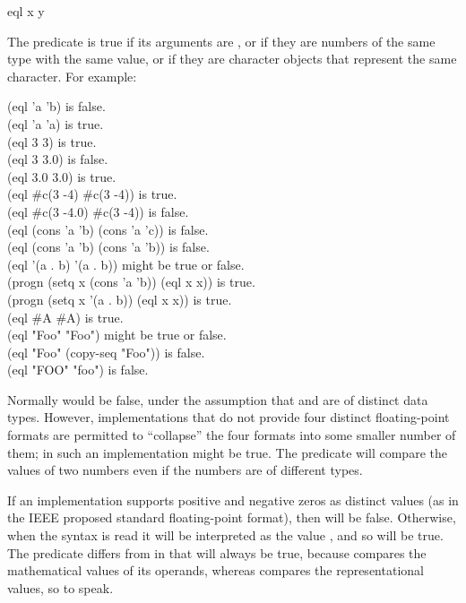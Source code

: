 \begin{defun}[Function]
eql x y

The  predicate is true if its arguments are ,
or if they are numbers of the same type with the same value,
or if they are character objects
that represent the same character.
For example:
\begin{lisp}
(eql 'a 'b) {\rm is false.} \\
(eql 'a 'a) {\rm is true.} \\
(eql 3 3) {\rm is true.} \\
(eql 3 3.0) {\rm is false.} \\
(eql 3.0 3.0) {\rm is true.} \\
(eql \#c(3 -4) \#c(3 -4)) {\rm is true.} \\
(eql \#c(3 -4.0) \#c(3 -4)) {\rm is false.} \\
(eql (cons 'a 'b) (cons 'a 'c)) {\rm is false.} \\
(eql (cons 'a 'b) (cons 'a 'b)) {\rm is false.} \\
(eql '(a . b) '(a . b)) {\rm might be true or false.} \\
(progn (setq x (cons 'a 'b)) (eql x x)) {\rm is true.} \\
(progn (setq x '(a . b)) (eql x x)) {\rm is true.} \\
(eql \#{\Xbackslash}A \#{\Xbackslash}A) {\rm is true.} \\
(eql "Foo" "Foo") {\rm might be true or false.} \\
(eql "Foo" (copy-seq "Foo")) {\rm is false.} \\
(eql "FOO" "foo") {\rm is false.}
\end{lisp}
Normally  would be false, under the assumption
that  and  are of distinct data types.
However, implementations that do not provide four distinct floating-point
formats are permitted to ``collapse'' the four formats into some
smaller number of them; in such an implementation 
might be true.  The predicate \cd{=} will compare
the values of two numbers even if the numbers are of different types.

If an implementation supports positive and negative zeros as distinct
values (as in the IEEE proposed standard floating-point format),
then  will be false.  Otherwise, when the syntax
 is read it will be interpreted as the value ,
and so  will be true.  The predicate \cd{=}
differs from  in that  will always be true,
because \cd{=} compares the mathematical values of its operands,
whereas  compares the representational values, so to speak.


\end{defun}
